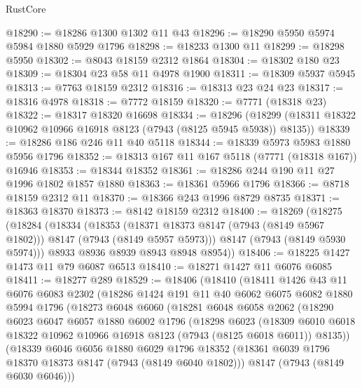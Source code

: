 \begin{lexlean}{RustCore}
\begin{coremodule}
@18290 := @18286 @1300 @1302 @11 @43
@18296 := @18290 @5950 @5974 @5984 @1880 @5929 @1796
@18298 := @18233 @1300 @11
@18299 := @18298 @5950
@18302 := @8043 @18159 @2312 @1864
@18304 := @18302 @180 @23
@18309 := @18304 @23 @58 @11 @4978 @1900
@18311 := @18309 @5937 @5945
@18313 := @7763 @18159 @2312
@18316 := @18313 @23 @24 @23
@18317 := @18316 @4978
@18318 := @7772 @18159
@18320 := @7771 (@18318 @23)
@18322 := @18317 @18320 @16698
@18334 := @18296
    (@18299 (@18311 @18322 @10962 @10966 @16918 @8123 (@7943 (@8125 @5945 @5938)) @8135))
@18339 := @18286 @186 @246 @11 @40 @5118
@18344 := @18339 @5973 @5983 @1880 @5956 @1796
@18352 := @18313 @167 @11 @167 @5118 (@7771 (@18318 @167)) @16946
@18353 := @18344 @18352
@18361 := @18286 @244 @190 @11 @27 @1996 @1802 @1857 @1880
@18363 := @18361 @5966 @1796
@18366 := @8718 @18159 @2312 @11
@18370 := @18366 @243 @1996 @8729 @8735
@18371 := @18363 @18370
@18373 := @8142 @18159 @2312
@18400 := @18269
    (@18275
      (@18284
        (@18334
          (@18353
            (@18371 @18373 @8147 (@7943 (@8149 @5967 @1802)))
            @8147
            (@7943 (@8149 @5957 @5973)))
          @8147
          (@7943 (@8149 @5930 @5974)))
        @8933
        @8936
        @8939
        @8943
        @8948
        @8954))
@18406 := @18225 @1427 @1473 @11 @79 @6087 @6513
@18410 := @18271 @1427 @11 @6076 @6085
@18411 := @18277 @289
@18529 := @18406
    (@18410
      (@18411
        @1426
        @43
        @11
        @6076
        @6083
        @2302
        (@18286
          @1424
          @191
          @11
          @40
          @6062
          @6075
          @6082
          @1880
          @5994
          @1796
          (@18273
            @6048
            @6060
            (@18281
              @6048
              @6058
              @2062
              (@18290
                @6023
                @6047
                @6057
                @1880
                @6002
                @1796
                (@18298
                  @6023
                  (@18309
                    @6010
                    @6018
                    @18322
                    @10962
                    @10966
                    @16918
                    @8123
                    (@7943 (@8125 @6018 @6011))
                    @8135))
                (@18339
                  @6046
                  @6056
                  @1880
                  @6029
                  @1796
                  @18352
                  (@18361 @6039 @1796 @18370 @18373 @8147 (@7943 (@8149 @6040 @1802)))
                  @8147
                  (@7943 (@8149 @6030 @6046)))

\end{coremodule}
\end{lexlean}
